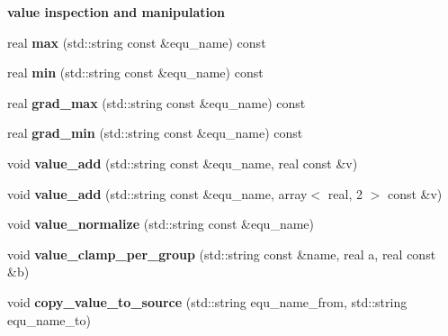 \begin{Indent}{\bf value inspection and manipulation}\par
\begin{DoxyCompactItemize}
\item 
\hypertarget{classProb_a070c8fd90e9380ce16bcbd71843dee87}{real {\bfseries max} (std\+::string const \&equ\+\_\+name) const }\label{classProb_a070c8fd90e9380ce16bcbd71843dee87}

\item 
\hypertarget{classProb_a7cd3cf3838b2f434db946420dddef4c3}{real {\bfseries min} (std\+::string const \&equ\+\_\+name) const }\label{classProb_a7cd3cf3838b2f434db946420dddef4c3}

\item 
\hypertarget{classProb_a081a8b2a0890f3756e77d2b641910a84}{real {\bfseries grad\+\_\+max} (std\+::string const \&equ\+\_\+name) const }\label{classProb_a081a8b2a0890f3756e77d2b641910a84}

\item 
\hypertarget{classProb_ad19b211a5a372a8f43e56897bf7ca9d3}{real {\bfseries grad\+\_\+min} (std\+::string const \&equ\+\_\+name) const }\label{classProb_ad19b211a5a372a8f43e56897bf7ca9d3}

\item 
\hypertarget{classProb_ae640aa1c7afdc30de6b49b576673c4cc}{void {\bfseries value\+\_\+add} (std\+::string const \&equ\+\_\+name, real const \&v)}\label{classProb_ae640aa1c7afdc30de6b49b576673c4cc}

\item 
\hypertarget{classProb_ace52b307acd315c5243f3aa676f2d550}{void {\bfseries value\+\_\+add} (std\+::string const \&equ\+\_\+name, array$<$ real, 2 $>$ const \&v)}\label{classProb_ace52b307acd315c5243f3aa676f2d550}

\item 
\hypertarget{classProb_a12688abbc76b07d448b2ed25d0b439a6}{void {\bfseries value\+\_\+normalize} (std\+::string const \&equ\+\_\+name)}\label{classProb_a12688abbc76b07d448b2ed25d0b439a6}

\item 
\hypertarget{classProb_a4fd63fbff17359e851c4078d82b6449a}{void {\bfseries value\+\_\+clamp\+\_\+per\+\_\+group} (std\+::string const \&name, real a, real const \&b)}\label{classProb_a4fd63fbff17359e851c4078d82b6449a}

\item 
\hypertarget{classProb_a7bb25a9a766484c678d7e23e4b5ea4a7}{void {\bfseries copy\+\_\+value\+\_\+to\+\_\+source} (std\+::string equ\+\_\+name\+\_\+from, std\+::string equ\+\_\+name\+\_\+to)}\label{classProb_a7bb25a9a766484c678d7e23e4b5ea4a7}

\end{DoxyCompactItemize}
\end{Indent}
